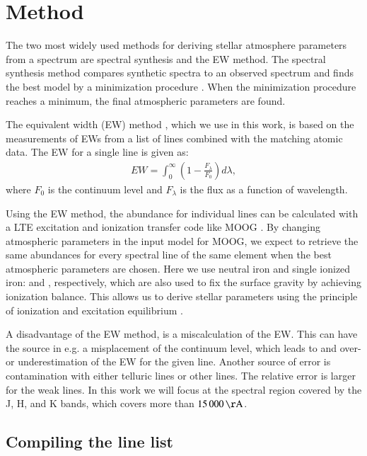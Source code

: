 \documentclass{aa}
\begin{document}
\section{Method}
\label{sec:method}

The two most widely used methods for deriving stellar atmosphere
parameters from a spectrum are spectral synthesis and the EW method.
The spectral synthesis method compares synthetic spectra
to an observed spectrum and finds the best model by a minimization
procedure \citep[see e.g.][]{Valenti2005,Onehag2012,Blanco2014}. When
the minimization procedure reaches a minimum, the final atmospheric
parameters are found.

The equivalent width (EW) method
\citep[see e.g.][]{Sousa2008a,Bensby2014,Mucciarelli2013}, which we use in this
work, is based on the measurements of EWs from a list of lines combined with
the matching atomic data.
The EW for a single line is given as:
\begin{align}
    \label{eq:EW}
    EW = \int_0^\infty \left(1 - \frac{F_\lambda}{F_0}\right) d\lambda,
\end{align}
where $F_0$ is the continuum level and $F_\lambda$ is the flux as a
function of wavelength.

Using the EW method, the abundance for individual lines can be
calculated with a LTE excitation and ionization transfer code like
MOOG \citep{Sneden1973}. By changing atmospheric parameters in the
input model for MOOG, we expect to retrieve the same abundances for
every spectral line of the same element when the best atmospheric
parameters are chosen. Here we use neutral iron and single ionized
iron:  and , respectively, which are also used
to fix the surface gravity by achieving ionization balance. This allows
us to derive stellar parameters using the principle of ionization and
excitation equilibrium \citep{Gray2006}.

A disadvantage of the EW method, is a miscalculation of the EW. This
can have the source in e.g. a misplacement of the continuum level,
which leads to and over- or underestimation of the EW for the given line.
Another source of error is contamination with either telluric lines
or other lines. The
relative error is larger for the weak lines. In this work we
will focus at the spectral region covered by the J, H, and K bands,
which covers more than $\SI{15000}{\AA}$.



\subsection{Compiling the line list}
\end{document}
